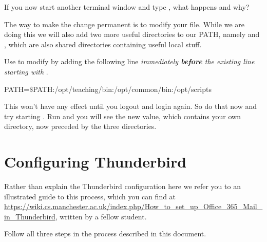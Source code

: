 If you now start another terminal window and type , what happens and why?

The way to make the change permanent is to modify your
 file. While we are doing this we will also add two more
useful directories to our PATH, namely  and ,
which are also shared directories containing useful local stuff.

Use  to modify   by adding the following line \emph{immediately \textbf{before} the existing line starting with }.

\begin{ttoutenv}
PATH=\$PATH:/opt/teaching/bin:/opt/common/bin:/opt/scripts
\end{ttoutenv}


This won't have any effect until you logout and login again. So do that now and try starting . Run  and you will see the new value, which contains  your own  directory, now preceded by the three  directories.


\section{Configuring Thunderbird}


Rather than explain the Thunderbird configuration here we refer you to an illustrated guide to this process, which you can find at \url{https://wiki.cs.manchester.ac.uk/index.php/How_to_set_up_Office_365_Mail_in_Thunderbird}, written by a fellow student.

Follow all three steps in the process described in this document.

